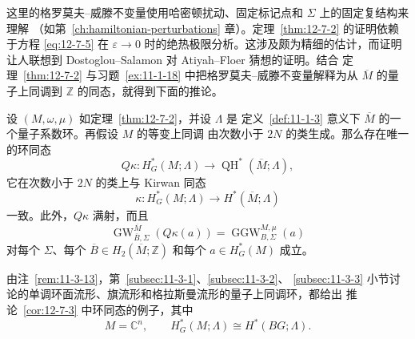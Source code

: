 这里的格罗莫夫--威滕不变量使用哈密顿扰动、固定标记点和 $\Sigma$ 上的固定复结构来理解
（如第~\ref{ch:hamiltonian-perturbations} 章）。定理~\ref{thm:12-7-2} 的证明依赖于方程
\eqref{eq:12-7-5} 在 $\varepsilon\to0$ 时的绝热极限分析。这涉及颇为精细的估计，而证明
让人联想到 Dostoglou--Salamon  对 Atiyah--Floer 猜想的证明。结合
定理~\ref{thm:12-7-2} 与习题~\ref{ex:11-1-18} 中把格罗莫夫--威滕不变量解释为从
$\overline M$ 的量子上同调到 $\mathbb Z$ 的同态，就得到下面的推论。

\begin{corollary}\label{cor:12-7-3}
设 $(M,\omega,\mu)$ 如定理~\ref{thm:12-7-2}，并设 $\Lambda$ 是
定义~\ref{def:11-1-3} 意义下 $\overline M$ 的一个量子系数环。再假设 $M$ 的等变上同调
由次数小于 $2N$ 的类生成。那么存在唯一的环同态
\begin{equation}\label{eq:12-7-6}
  Q\kappa:H_G^*(M;\Lambda)
  \longrightarrow\operatorname{QH}^*(\overline M;\Lambda),
\end{equation}
它在次数小于 $2N$ 的类上与 Kirwan 同态
\[
  \kappa:H_G^*(M;\Lambda)\longrightarrow H^*(\overline M;\Lambda)
\]
一致。此外，$Q\kappa$ 满射，而且
\[
  \operatorname{GW}^{\overline M}_{\overline B,\Sigma}(Q\kappa(a))
  =\operatorname{GGW}^{M,\mu}_{B,\Sigma}(a)
\]
对每个 $\Sigma$、每个 $\overline B\in H_2(\overline M;\mathbb Z)$ 和每个
$a\in H_G^*(M)$ 成立。
\end{corollary}

由注~\ref{rem:11-3-13}，第~\ref{subsec:11-3-1}、\ref{subsec:11-3-2}、
\ref{subsec:11-3-3} 小节讨论的单调环面流形、旗流形和格拉斯曼流形的量子上同调环，都给出
推论~\ref{cor:12-7-3} 中环同态的例子，其中
\[
  M=\mathbb C^n,
  \qquad H_G^*(M;\Lambda)\cong H^*(BG;\Lambda).
\]

